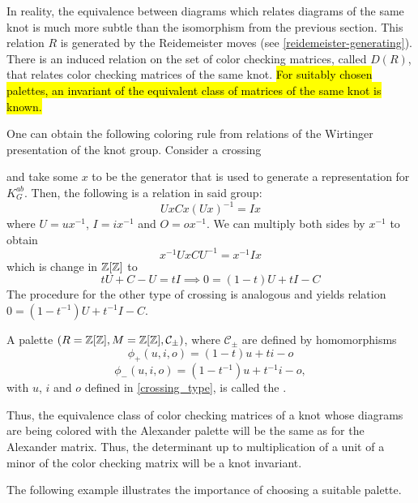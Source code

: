 In reality, the equivalence between diagrams which relates diagrams of the same knot is much more subtle than the isomorphism from the previous section. This relation $R$ is generated by the Reidemeister moves (see \cref{reidemeister-generating}). There is an induced relation on the set of color checking matrices, called $D(R)$, that relates color checking matrices of the same knot. 
\hl{For suitably chosen palettes, an invariant of the equivalent class of matrices of the same knot is known.} 

One can obtain the following coloring rule from relations of the Wirtinger presentation of the knot group. Consider a crossing
\begin{center}
\end{center}
and take some $x$ to be the generator that is used to generate a representation for $K_G^{ab}$. Then, the following is a relation in said group:
$$UxCx(Ux)^{-1}=Ix$$
where $U=ux^{-1}$, $I=ix^{-1}$ and $O=ox^{-1}$. 
We can multiply both sides by $x^{-1}$ to obtain
$$x^{-1}UxCU^{-1}=x^{-1}Ix$$
which is change in $\operatorname{\mathbb{Z}}[\operatorname{\mathbb{Z}}]$ to
$$
tU+C-U=tI\implies 0=(1-t)U+tI-C
$$
The procedure for the other type of crossing is analogous and yields relation $0=(1-t^{-1})U+t^{-1}I-C$.

\begin{definition}
A palette {\boldmath$(R=\operatorname{\mathbb{Z}}[\operatorname{\mathbb{Z}}], M=\operatorname{\mathbb{Z}}[\operatorname{\mathbb{Z}}], \mathcal{C}_\pm)$}, where $\mathcal{C}_\pm$ are defined by homomorphisms
$$\phi_+(u,i,o)=(1-t)u+ti-o$$
$$\phi_-(u,i,o)=(1-t^{-1})u+t^{-1}i-o,$$
with $u$, $i$ and $o$ defined in \cref{crossing_type}, is called the .
\end{definition}


Thus, the equivalence class of color checking matrices of a knot whose diagrams are being colored with the Alexander palette will be the same as for the Alexander matrix. Thus, the determinant up to multiplication of a unit of a minor of the color checking matrix will be a knot invariant.


The following example illustrates the importance of choosing a suitable palette.

